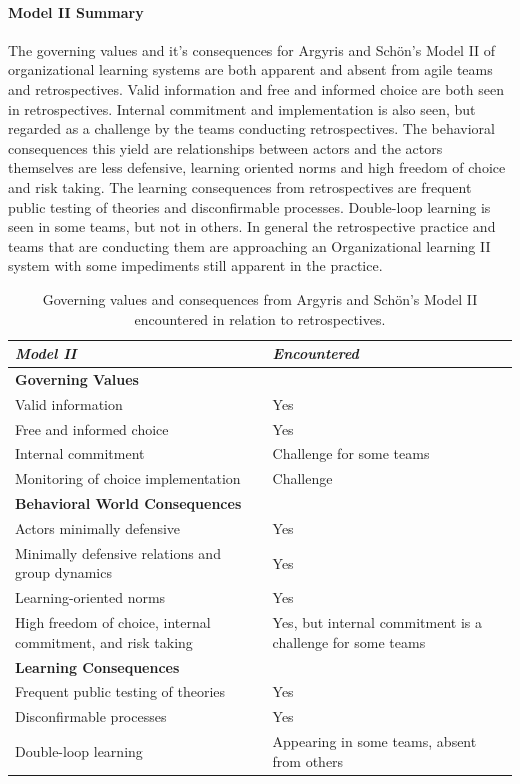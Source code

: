 \paragraph{Model II Summary}
The governing values and it's consequences for Argyris and Schön's Model II of organizational learning systems are both apparent and absent from agile teams and retrospectives. Valid information and free and informed choice are both seen in retrospectives. Internal commitment and implementation is also seen, but regarded as a challenge by the teams conducting retrospectives. The behavioral consequences this yield are relationships between actors and the actors themselves are less defensive, learning oriented norms and high freedom of choice and risk taking. The learning consequences from retrospectives are frequent public testing of theories and disconfirmable processes. Double-loop learning is seen in some teams, but not in others. In general the retrospective practice and teams that are conducting them are approaching an Organizational learning II system with some impediments still apparent in the practice.

\begin{table}[h]
	\begin{center}
		\caption{Governing values and consequences from Argyris and Schön's Model II encountered in relation to retrospectives.}
		\label{table:model-ii-occurences}
		\begin{tabular}{p{} p{}}
			\hline
			\textit{Model II} & \textit{Encountered} \\
			\hline
			\textbf{Governing Values} & \\
			Valid information & Yes \\
			Free and informed choice & Yes \\
			Internal commitment & Challenge for some teams \\
			Monitoring of choice implementation & Challenge \\
			\hline
			\textbf{Behavioral World Consequences} & \\
			Actors minimally defensive & Yes \\
			Minimally defensive relations and group dynamics & Yes \\
			Learning-oriented norms & Yes \\
			High freedom of choice, internal commitment, and risk taking & Yes, but internal commitment is a challenge for some teams \\
			\hline
			\textbf{Learning Consequences} & \\
			Frequent public testing of theories & Yes \\
			Disconfirmable processes & Yes \\
			Double-loop learning & Appearing in some teams, absent from others \\
			\hline
		\end{tabular}
	\end{center}
\end{table}

